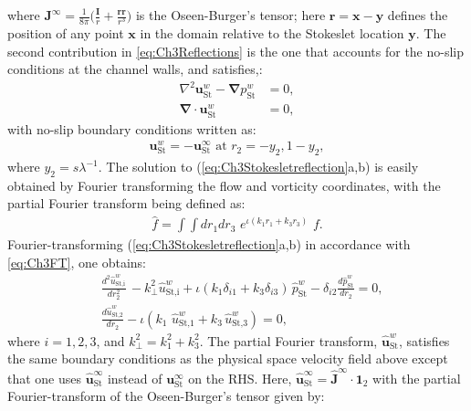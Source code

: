 \documentclass{jfm}
\begin{document}
where $\bm{J}^\infty=\frac{1}{8\pi}\big(\frac{\bm{I}}{r}+\frac{\bm{rr}}{r^3}\big)$ is the Oseen-Burger's tensor; here $\bm{r}=\bm{x}-\bm{y}$ defines the position of any point $\bm{x}$ in the domain relative to the Stokeslet location $\bm{y}$. The second contribution in \eqref{eq:Ch3Reflections} is the one that accounts for the no-slip conditions at the channel walls, and satisfies,:
\begin{subequations}
	\begin{align}
	\nabla^2\bm{u}^{w}_\text{St}-\bm{\nabla} p_\text{St}^{w} &= 0, \\
	\bm{\nabla}\cdot\bm{u}^{w}_\text{St} &= 0,
	\end{align} 	\label{eq:Ch3Stokesletreflection} 
\end{subequations}
with no-slip boundary conditions written as:
\begin{align}
	\bm{u}^{w}_\text{St} = -\bm{u}^{\infty}_\text{St} \text{ at } r_2=-y_2, 1-y_2,
	\label{eq:Ch3wallBCFull}
\end{align}
where $y_2=s\lambda^{-1}$. The solution to (\ref{eq:Ch3Stokesletreflection}a,b) is easily obtained by Fourier transforming the flow and vorticity coordinates, with the partial Fourier transform being defined as:
\begin{align}
\hat{f}=\int\int dr_1 dr_3\,\,e^{\iota(k_1 r_1+k_3 r_3)}\,\,f.
\label{eq:Ch3FT}
\end{align}
Fourier-transforming (\ref{eq:Ch3Stokesletreflection}a,b) in accordance with \eqref{eq:Ch3FT}, one obtains:
\begin{subequations}
	\begin{align}
	&\frac{d^2 \hat{u}^{w}_\text{St,i}}{d r_2^2}\,-k_\perp^2\hat{u}^{w}_\text{St,i}+\iota (k_1\delta_{i1}+k_3\delta_{i3})\,\hat{p}_\text{St}^{w}-\delta_{i2}\frac{d\hat{p}_\text{St}^{w}}{d r_2} = 0, \\
	&\frac{d\hat{u}^{w}_\text{St,2}}{d r_2}-\iota (k_1\,\, \hat{u}^{w}_\text{St,1}+k_3\,\hat{u}^{w}_\text{St,3})=0,
	\end{align} \label{eq:Ch3stokesletFT}
\end{subequations}
where $i=1,2, 3$, and $k_\perp^2=k_1^2+k_3^2$. The partial Fourier transform, $\bm{\hat{u}}^{w}_\text{St}$, satisfies the same boundary conditions as the physical space velocity field above except that one uses $\hat{\bm{u}}^{\infty}_\text{St}$ instead of $\bm{u}^{\infty}_\text{St}$ on the RHS.
Here, $\hat{\bm{u}}^{\infty}_\text{St} =\hat{\bm{J}}^\infty\cdot\bm{1}_2$ with the partial Fourier-transform of the Oseen-Burger's tensor given by:
\end{document}
